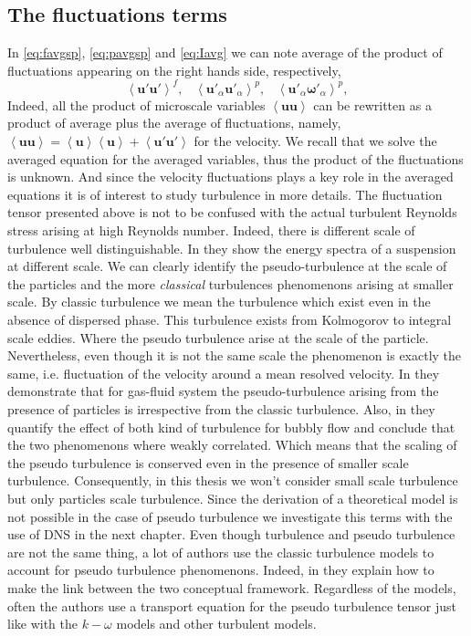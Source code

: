 \subsection{The fluctuations terms}
In \ref{eq:favgsp}, \ref{eq:pavgsp} and \ref{eq:Iavg} we can note average of the product of fluctuations appearing on the right hands side, respectively,
\begin{equation}
    \left<\bm{u'u'}\right>^f, \;\;\;\left<\bm{u'}_\alpha \bm{u'}_\alpha\right>^p, \;\;\;\left<\bm{u'}_\alpha \bm{\omega}'_\alpha\right>^p,
\end{equation} 
Indeed, all the product of microscale variables $\left<\bm{uu}\right>$ can be rewritten as a product of average plus the average of fluctuations, namely, $\left<\bm{uu}\right> = \left<\bm{u}\right>\left<\bm{u}\right> + \left<\bm{u'u'}\right>$ for the velocity. 
We recall that we solve the averaged equation for the averaged variables, thus the product of the fluctuations is unknown.
And since the velocity fluctuations plays a key role in the averaged equations it is of interest to study turbulence in more details. 
The fluctuation tensor presented above is not to be confused with the actual turbulent Reynolds stress arising at high Reynolds number. 
Indeed, there is different scale of turbulence well distinguishable. 
In \cite[Figure 1]{balachandar2009scaling} they show the energy spectra of a suspension at different scale.
We can clearly identify the pseudo-turbulence at the scale of the particles and the more \textit{classical} turbulences phenomenons arising at smaller scale. 
By classic turbulence we mean the turbulence which exist even in the absence of dispersed phase. 
This turbulence exists from Kolmogorov to integral scale eddies. 
Where the pseudo turbulence arise at the scale of the particle.
Nevertheless, even though it is not the same scale the phenomenon is exactly the same, i.e. fluctuation of the velocity around a mean resolved velocity. 
In \citet{mehrabadi2015pseudo} they demonstrate that for gas-fluid system the pseudo-turbulence arising from the presence of particles is irrespective from the classic turbulence. 
Also, in \citet{risso2018agitation} they quantify the effect of both kind of turbulence for bubbly flow and conclude that the two phenomenons where weakly correlated. 
Which means that the scaling of the pseudo turbulence is conserved even in the presence of smaller scale turbulence. 
Consequently, in this thesis we won't consider small scale turbulence but only particles scale turbulence. 
Since the derivation of a theoretical model is not possible in the case of pseudo turbulence we investigate this terms with the use of DNS in the next chapter.
Even though turbulence and pseudo turbulence are not the same thing, a lot of authors use the classic turbulence models to account for pseudo turbulence phenomenons. 
Indeed, in \citet{gemello2018modelling} they explain how to make the link between the two conceptual framework.
Regardless of the models, often the authors use a transport equation for the pseudo turbulence tensor \citep{du2022analysis} just like with the $k-\omega$ models and other turbulent models. 
